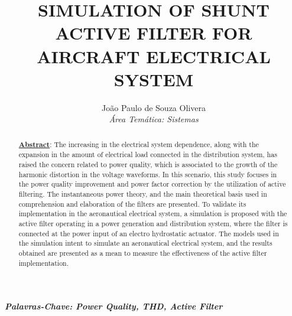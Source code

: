 \documentclass[]{seti2}
\title{\uppercase{Simulation of Shunt Active Filter for Aircraft Electrical System}}
\author{
					João Paulo de Souza Olivera\\
					{\normalsize\itshape Área Temática: Sistemas}\\
				}
\begin{document}
\maketitle

\begin{abstract}
		\underline{\textbf{Abstract}}: The increasing in the electrical system dependence, along with the expansion in the amount of electrical load connected in the distribution system, has raised the concern related to power quality, which is associated to the growth of the harmonic distortion in the voltage waveforms. In this scenario, this study focuses in the power quality improvement and power factor correction by the utilization of active filtering. The instantaneous power theory, and the main theoretical basis used in comprehension and elaboration of the filters are presented. To validate its implementation in the aeronautical electrical system, a simulation is proposed with the active filter operating in a power generation and distribution system, where the filter is connected at the power input of an electro hydrostatic actuator. The models used in the simulation intent to simulate an aeronautical electrical system, and the results obtained are presented as a mean to measure the effectiveness of the active filter implementation.
\end{abstract}

\textbf{\textit{Palavras-Chave: Power Quality, THD, Active Filter}}








\newpage

\end{document}
